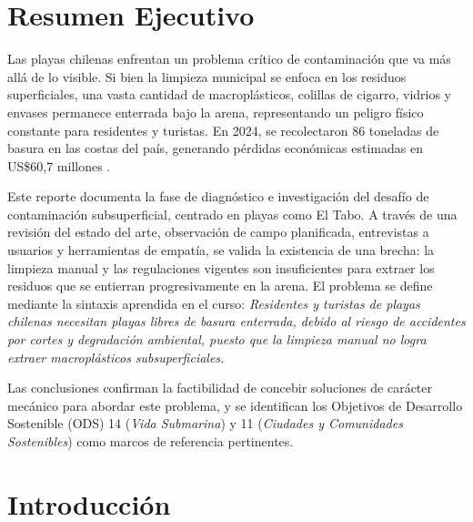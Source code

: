 \documentclass[12pt, letterpaper]{article}
\begin{document}
\newpage
\thispagestyle{empty}
\tableofcontents
\newpage

\setcounter{page}{1}

\section*{Resumen Ejecutivo}

Las playas chilenas enfrentan un problema crítico de contaminación que va más allá de lo visible.
Si bien la limpieza municipal se enfoca en los residuos superficiales, una vasta cantidad de
macroplásticos, colillas de cigarro, vidrios y envases permanece enterrada bajo la arena,
representando un peligro físico constante para residentes y turistas.
En 2024, se recolectaron 86 toneladas de basura en las costas del país, generando pérdidas
económicas estimadas en US\$60,7 millones \parencite{oceana_2026}.

Este reporte documenta la fase de diagnóstico e investigación del desafío de contaminación
subsuperficial, centrado en playas como El Tabo. A través de una revisión del estado del arte,
observación de campo planificada, entrevistas a usuarios y herramientas de empatía, se valida
la existencia de una brecha: la limpieza manual y las regulaciones vigentes son insuficientes
para extraer los residuos que se entierran progresivamente en la arena.
El problema se define mediante la sintaxis aprendida en el curso:
\textit{Residentes y turistas de playas chilenas necesitan playas libres de basura enterrada,
	debido al riesgo de accidentes por cortes y degradación ambiental, puesto que la limpieza
	manual no logra extraer macroplásticos subsuperficiales.}

Las conclusiones confirman la factibilidad de concebir soluciones de carácter mecánico para
abordar este problema, y se identifican los Objetivos de Desarrollo Sostenible (ODS) 14
(\textit{Vida Submarina}) y 11 (\textit{Ciudades y Comunidades Sostenibles}) como marcos
de referencia pertinentes.

\newpage
\section{Introducción}
\end{document}
